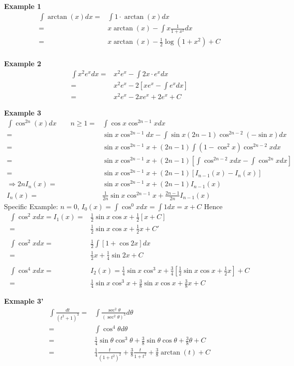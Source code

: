 \documentclass[12pt]{article}
\theoremstyle{plain}
\begin{document}
{\color{Brown}
\textbf{Example 1} 
\begin{align*}
	\int \arctan(x)dx 
	=& \int 1\cdot \arctan(x)dx\\
	=& x\arctan(x) - \int x \frac1{1+x^2}dx\\
	=& x\arctan(x) - \frac12 \log(1+x^2) + C\\
\end{align*}

\textbf{Example 2} 
\begin{align*}
	\int x^2e^xdx 
	=& x^2e^x - \int 2x\cdot e^x dx \\
	=& x^2e^x - 2[xe^x-\int e^xdx] \\
	=& x^2e^x -2xe^x + 2e^x + C
\end{align*}

\textbf{Example 3} 
\begin{align*}
	\int \cos^{2n}(x)dx \qquad n\geq 1 \tag{$I_n$} 
	=& \int \cos x \cos^{2n-1} x dx\\
	=& \sin x \cos^{2n-1} dx - \int \sin x (2n-1) \cos^{2n-2}(-\sin x)dx\\
	=& \sin x \cos ^{2n-1} x + (2n-1)\int (1-\cos^2 x)\cos^{2n-2}xdx\\
	=& \sin x \cos^{2n-1} x + (2n-1)[\int\cos^{2n-2}xdx-\int \cos^{2n}xdx]\\
	=& \sin x \cos^{2n-1} x + (2n-1) [I_{n-1}(x) - I_n(x)]\\
	\Rightarrow 
	2n I_n(x) =& \sin x \cos^{2n-1}x + (2n-1)I_{n-1}(x)\\
	I_n(x) =& \frac1{2n} \sin x \cos^{2n-1}x +\frac{2n-1}{2n}I_{n-1}(x)
	\tag{"Reduction Fomula"}
\end{align*}
Specific Example: $n=0$, $I_0(x) = \int\cos^0 x dx = \int 1dx = x+C$
Hence 
\begin{align*}
	\int \cos^2 x dx = I_1 (x) 
	=& \frac12\sin x\cos x + \frac12[x+C]\\
	=&\frac12\sin x\cos x + \frac 12 x + C'\\\\
%
	\int \cos^2 x dx = &\frac12 \int [1+\cos 2x]dx\\
	= &\frac 12 x + \frac 14 \sin 2x + C\\\\
%
	\int \cos^4 x dx 
	=& I_2(x) 
	=\frac 14 \sin x\cos^3 x +
	\frac 34 [\frac 12 \sin x \cos x + \frac 12 x] + C\\
	=& \frac 14 \sin x \cos^3 x + \frac 38\sin x \cos x + \frac 38 x + C
\end{align*}

\textbf{Exmaple 3'} 
\begin{align*}
	\int \frac{dt}{(t^2+1)^3}
	=& \int \frac{\sec^2 \theta}{(\sec^2\theta)^3}d\theta\\
	=& \int \cos^4\theta d\theta\\
	=& \frac 14 \sin \theta\cos^3\theta + \frac 38 \sin \theta \cos \theta
	+\frac 38 \theta + C\\
	=& \frac 14 \frac t{(1+t^2)^2} + \frac 38 \frac t{1+t^2}
	+\frac 38 \arctan (t) + C
\end{align*}

}
\end{document}

